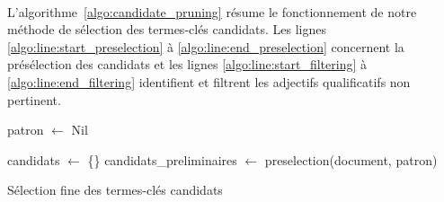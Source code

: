         \paragraph{}
        L'algorithme~\ref{algo:candidate_pruning} résume le
        fonctionnement de notre méthode de sélection des termes-clés candidats.
        Les lignes \ref{algo:line:start_preselection} à
        \ref{algo:line:end_preselection} concernent la présélection des
        candidats et les lignes \ref{algo:line:start_filtering} à
        \ref{algo:line:end_filtering} identifient et filtrent les adjectifs
        qualificatifs non pertinent.
        \begin{algorithm}[h!]
          \DontPrintSemicolon{}

          \BlankLine

          patron $\leftarrow$ Nil\;\label{algo:line:start_preselection}

          candidats $\leftarrow$ \{\}\;
          candidats\_preliminaires $\leftarrow$ preselection(document, patron)\;\label{algo:line:end_preselection}

          \label{algo:line:end_filtering}


          \caption{Sélection fine des termes-clés candidats
                   \label{algo:candidate_pruning}}
        \end{algorithm}

